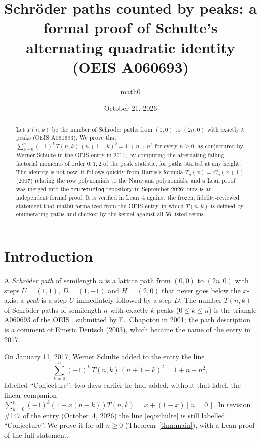 \documentclass[11pt]{amsart}
\title[Schulte's alternating quadratic identity for Schr\"oder paths]{Schr\"oder paths counted by peaks: a formal proof of Schulte's alternating quadratic identity (OEIS A060693)}
\author{math0}
\date{October 21, 2026}
\theoremstyle{plain}
\theoremstyle{definition}
\newcommand{\ib}[1]{[\,#1\,]}
\begin{document}
\begin{abstract}
Let $T(n,k)$ be the number of Schr\"oder paths from $(0,0)$ to $(2n,0)$ with exactly $k$ peaks (OEIS A060693).
We prove that $\sum_{k=0}^{n}(-1)^k\,T(n,k)\,(n+1-k)^2=1+n+n^2$ for every $n\ge0$, as conjectured by Werner Schulte in the OEIS entry in 2017, by computing the alternating falling-factorial moments of order $0,1,2$ of the peak statistic, for paths started at any height.
The identity is not new: it follows quickly from Harris's formula $T_n(x)=C_n(x+1)$ (2007) relating the row polynomials to the Narayana polynomials, and a Lean proof was merged into the \texttt{trureturing} repository in September 2026; ours is an independent formal proof.
It is verified in Lean~4 against the frozen, fidelity-reviewed statement that math0 formalized from the OEIS entry, in which $T(n,k)$ is defined by enumerating paths and checked by the kernel against all $56$ listed terms.
\end{abstract}
\maketitle

\section{Introduction}

A \emph{Schr\"oder path} of semilength $n$ is a lattice path from $(0,0)$ to $(2n,0)$ with steps $U=(1,1)$, $D=(1,-1)$ and $H=(2,0)$ that never goes below the $x$-axis; a \emph{peak} is a step $U$ immediately followed by a step $D$. The number $T(n,k)$ of Schr\"oder paths of semilength $n$ with exactly $k$ peaks ($0\le k\le n$) is the triangle A060693 of the OEIS \cite{A060693}, submitted by F.~Chapoton in 2001; the path description is a comment of Emeric Deutsch (2003), which became the name of the entry in 2017.

On January 11, 2017, Werner Schulte added to the entry the line
\begin{equation}\label{eq:schulte}
  \sum_{k=0}^{n}(-1)^k\,T(n,k)\,(n+1-k)^2=1+n+n^2 ,
\end{equation}
labelled ``Conjecture''; two days earlier he had added, without that label, the linear companion $\sum_{k=0}^n(-1)^k(1+x(n-k))T(n,k)=x+(1-x)\ib{n=0}$. In revision \#147 of the entry (October~4, 2026) the line \eqref{eq:schulte} is still labelled ``Conjecture''. We prove it for all $n\ge0$ (Theorem~\ref{thm:main}), with a Lean proof of the full statement.
\end{document}
